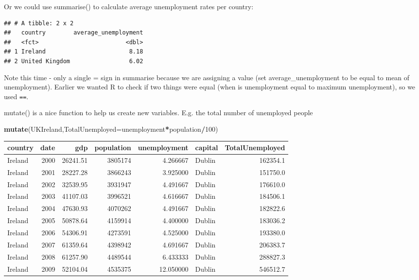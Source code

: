 \documentclass[]{book}
\newenvironment{Shaded}{\begin{snugshade}}{\end{snugshade}}
\newcommand{\DataTypeTok}[1]{\textcolor[rgb]{0.13,0.29,0.53}{#1}}
\newcommand{\DecValTok}[1]{\textcolor[rgb]{0.00,0.00,0.81}{#1}}
\newcommand{\KeywordTok}[1]{\textcolor[rgb]{0.13,0.29,0.53}{\textbf{#1}}}
\newcommand{\NormalTok}[1]{#1}
\newcommand{\OperatorTok}[1]{\textcolor[rgb]{0.81,0.36,0.00}{\textbf{#1}}}
\newcommand{\StringTok}[1]{\textcolor[rgb]{0.31,0.60,0.02}{#1}}
\begin{document}
Or we could use summarise() to calculate average unemployment rates per country:

\begin{Shaded}
\end{Shaded}

\begin{verbatim}
## # A tibble: 2 x 2
##   country        average_unemployment
##   <fct>                         <dbl>
## 1 Ireland                        8.18
## 2 United Kingdom                 6.02
\end{verbatim}

Note this time - only a single = sign in summarise because we are assigning a value (set average\_unemployment to be equal to mean of unemployment). Earlier we wanted R to check if two things were equal (when is unemployment equal to maximum unemployment), so we used \texttt{==}.

mutate() is a nice function to help us create new variables. E.g. the total number of unemployed people

\begin{Shaded}
\begin{Highlighting}[]
\KeywordTok{mutate}\NormalTok{(UKIreland,}\DataTypeTok{TotalUnemployed=}\NormalTok{unemployment}\OperatorTok{*}\NormalTok{population}\OperatorTok{/}\DecValTok{100}\NormalTok{)}
\end{Highlighting}
\end{Shaded}

\begin{tabular}{lrrrrlr}
\toprule
country & date & gdp & population & unemployment & capital & TotalUnemployed\\
\midrule
Ireland & 2000 & 26241.51 & 3805174 & 4.266667 & Dublin & 162354.1\\
Ireland & 2001 & 28227.28 & 3866243 & 3.925000 & Dublin & 151750.0\\
Ireland & 2002 & 32539.95 & 3931947 & 4.491667 & Dublin & 176610.0\\
Ireland & 2003 & 41107.03 & 3996521 & 4.616667 & Dublin & 184506.1\\
Ireland & 2004 & 47630.93 & 4070262 & 4.491667 & Dublin & 182822.6\\
\addlinespace
Ireland & 2005 & 50878.64 & 4159914 & 4.400000 & Dublin & 183036.2\\
Ireland & 2006 & 54306.91 & 4273591 & 4.525000 & Dublin & 193380.0\\
Ireland & 2007 & 61359.64 & 4398942 & 4.691667 & Dublin & 206383.7\\
Ireland & 2008 & 61257.90 & 4489544 & 6.433333 & Dublin & 288827.3\\
Ireland & 2009 & 52104.04 & 4535375 & 12.050000 & Dublin & 546512.7\\
\bottomrule
\end{tabular}
\end{document}
